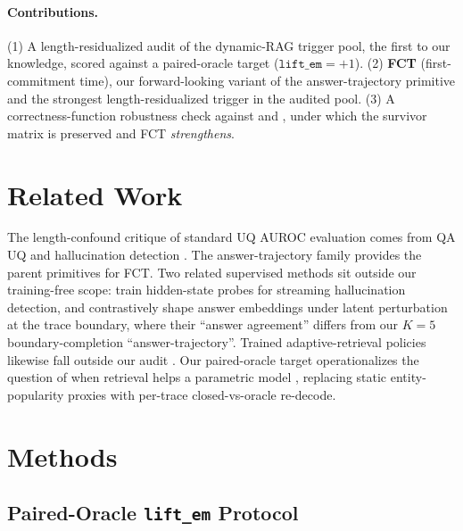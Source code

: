 \documentclass[11pt]{article}
\begin{document}
\paragraph{Contributions.} (1) A length-residualized audit of the dynamic-RAG trigger pool, the first to our knowledge, scored against a paired-oracle target ($\texttt{lift\_em}{=}+1$). (2) \textbf{FCT} (first-commitment time), our forward-looking variant of the answer-trajectory primitive and the strongest length-residualized trigger in the audited pool. (3) A correctness-function robustness check against \citet{janiak_illusion_2025} and \citet{ielanskyi_addressing_2025}, under which the survivor matrix is preserved and FCT \emph{strengthens}.

\section{Related Work}
\label{sec:related}

The length-confound critique of standard UQ AUROC evaluation comes from QA UQ and hallucination detection \citep{santilli_revisiting_2025, janiak_illusion_2025, zhang_verbosity_2024, ielanskyi_addressing_2025, vashurin_uncertainty-line_2025, mao_confidence_2026}. The answer-trajectory family \citep{datta_large_2026, wang_chain--probe_2025, chen_i_2026} provides the parent primitives for FCT. Two related supervised methods sit outside our training-free scope: \citet{lu_streaming_2026} train hidden-state probes for streaming hallucination detection, and \citet{zhang_harnessing_2026} contrastively shape answer embeddings under latent perturbation at the trace boundary, where their ``answer agreement'' differs from our $K{=}5$ boundary-completion ``answer-trajectory''. Trained adaptive-retrieval policies likewise fall outside our audit \citep{asai_self-rag_2023, guo_dior_2025}. Our paired-oracle target operationalizes the question of when retrieval helps a parametric model \citep{mallen_when_2023}, replacing static entity-popularity proxies with per-trace closed-vs-oracle re-decode.
\section{Methods}
\label{sec:methods}

\subsection{Paired-Oracle \texttt{lift\_em} Protocol}
\label{sec:methods-protocol}
\end{document}
